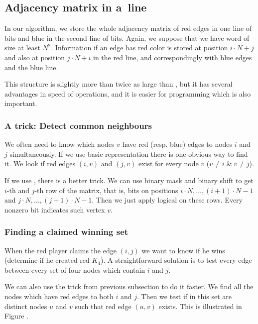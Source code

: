 \subsection{Adjacency matrix in a~line}

In our algorithm, we store the whole adjacency matrix of red edges in one line of bits and blue 
in the second line of bits. Again, we suppose that we have word of size at least
$N^2$. Information if an edge has red color is stored at position $i \cdot N+j$ and
also at position $j \cdot N+i$ in the red line, and correspondingly with blue edges and
the blue line.

This structure is slightly more than twice as large than , but it has
several advantages in speed of operations, and it is easier for programming which
is also important. 

\subsubsection{A trick: Detect common neighbours}

We often need to know which nodes $v$ have red (resp. blue) edges to nodes $i$ and $j$
simultaneously. If we use basic representation there is one obvious way to find it.
We look if red edges $(i,v)$ and $(j,v)$ exist for every node $v$ ($v \ne i \;
\& \; v \ne j$). 

If we use , there is a better trick. We can
use binary mask and binary shift to get $i$-th and $j$-th row of the matrix, that is, bits
on positions $i \cdot N, \ldots, (i\!+\!1)\! \cdot \!N\!-\!1$ and $j \cdot N, \ldots,
(j\!+\!1)\!\cdot\!N\!-\!1 $. Then we just apply logical  on these rows. Every nonzero bit
indicates such vertex $v$.

\subsubsection{Finding a claimed winning set} 

When the red player claims the edge $(i,j)$ we want to know if he wins (determine if he
created red $K_4$). A straightforward solution is to test every edge between every set
of four nodes which contain $i$ and $j$. 

We can also use the trick from previous subsection to do it faster. We find all
the nodes which have red edges to both $i$ and $j$. Then we test if in this
set are distinct nodes $u$ and $v$ such that red edge $(u,v)$ exists. This is illustrated
in Figure .


